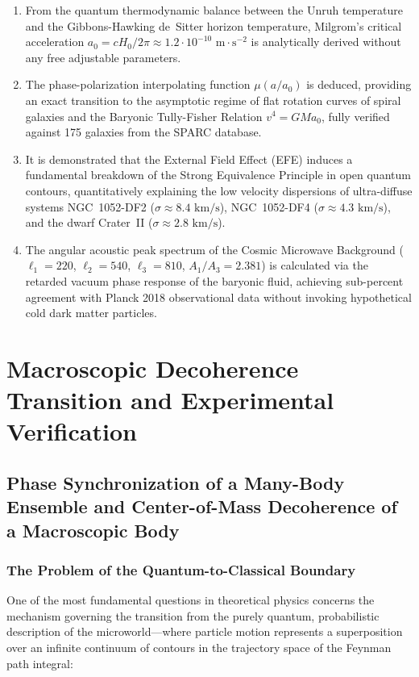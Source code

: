 \documentclass[11pt,a4paper]{article}
\theoremstyle{definition}
\begin{document}
\begin{enumerate}
\item From the quantum thermodynamic balance between the Unruh temperature and the Gibbons-Hawking de~Sitter horizon temperature, Milgrom's critical acceleration $a_0 = c H_0 / 2\pi \approx 1.2 \cdot 10^{-10}\text{ m}\cdot\text{s}^{-2}$ is analytically derived without any free adjustable parameters.
\item The phase-polarization interpolating function $\mu(a/a_0)$ is deduced, providing an exact transition to the asymptotic regime of flat rotation curves of spiral galaxies and the Baryonic Tully-Fisher Relation $v^4 = G M a_0$, fully verified against 175 galaxies from the SPARC database.
\item It is demonstrated that the External Field Effect (EFE) induces a fundamental breakdown of the Strong Equivalence Principle in open quantum contours, quantitatively explaining the low velocity dispersions of ultra-diffuse systems NGC~1052-DF2 ($\sigma \approx 8.4\text{ km/s}$), NGC~1052-DF4 ($\sigma \approx 4.3\text{ km/s}$), and the dwarf Crater~II ($\sigma \approx 2.8\text{ km/s}$).
\item The angular acoustic peak spectrum of the Cosmic Microwave Background ($\ell_1=220$, $\ell_2=540$, $\ell_3=810$, $A_1/A_3=2.381$) is calculated via the retarded vacuum phase response of the baryonic fluid, achieving sub-percent agreement with Planck 2018 observational data without invoking hypothetical cold dark matter particles.
\end{enumerate}

\section{Macroscopic Decoherence Transition and Experimental Verification}\label{sec:rozdil5}

\subsection{Phase Synchronization of a Many-Body Ensemble and Center-of-Mass Decoherence of a Macroscopic Body}\label{sec:5.1}

\subsubsection{The Problem of the Quantum-to-Classical Boundary}\label{sec:5.1.1}

One of the most fundamental questions in theoretical physics concerns the mechanism governing the transition from the purely quantum, probabilistic description of the microworld---where particle motion represents a superposition over an infinite continuum of contours in the trajectory space of the Feynman path integral:
\end{document}
